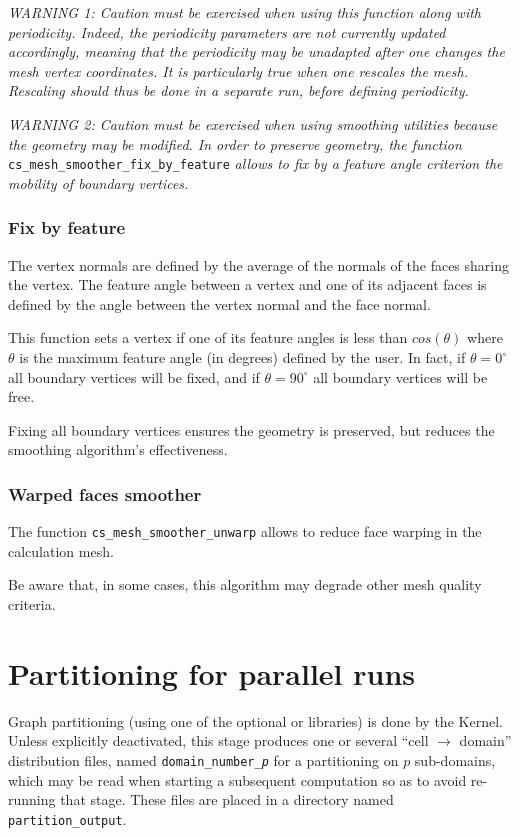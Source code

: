 {{{\em WARNING 1: Caution must be exercised when using this function
along with periodicity. Indeed, the periodicity parameters are not
currently updated accordingly, meaning that the periodicity may be
unadapted after one changes the mesh vertex coordinates. It is particularly
true when one rescales the mesh. Rescaling should thus be done
in a separate run, before defining periodicity.}

{\em WARNING 2: Caution must be exercised when using smoothing utilities
because the geometry may be modified. In order to preserve geometry,
the function} \texttt{cs\_mesh\_smoother\_fix\_by\_feature} {\em allows to
fix by a feature angle criterion the mobility of boundary vertices.}

\subsubsection{Fix by feature}
The vertex normals are defined by the average of the normals of the
faces sharing the vertex.
The feature angle between a vertex and one of its adjacent faces is defined
by the angle between the vertex normal and the face normal.

This function sets a vertex if one of its feature angles is less than
$cos(\theta)$ where $\theta$ is the maximum feature angle (in degrees)
defined by the user.
In fact, if $\theta = 0^{\circ}$ all boundary vertices will be fixed, and
if $\theta = 90^{\circ}$ all boundary vertices will be free.

Fixing all boundary vertices ensures the geometry is preserved, but reduces
the smoothing algorithm's effectiveness.

\subsubsection{Warped faces smoother}

The function \texttt{cs\_mesh\_smoother\_unwarp} allows to reduce face warping
in the calculation mesh.

Be aware that, in some cases, this algorithm may degrade other mesh quality
criteria.

\section{Partitioning for parallel runs\label{sec:parall:part}}

Graph partitioning (using one of the optional \metis or
\scotch libraries) is done by the Kernel. Unless explicitly
deactivated, this stage produces one or several ``cell $\rightarrow$ domain''
distribution files, named {\tt domain\_number\_\it{p}} for a partitioning on
$p$ sub-domains, which may be read when starting a subsequent computation so as
to avoid re-running that stage. These files are placed in a directory named
{\tt partition\_output}.

}}
